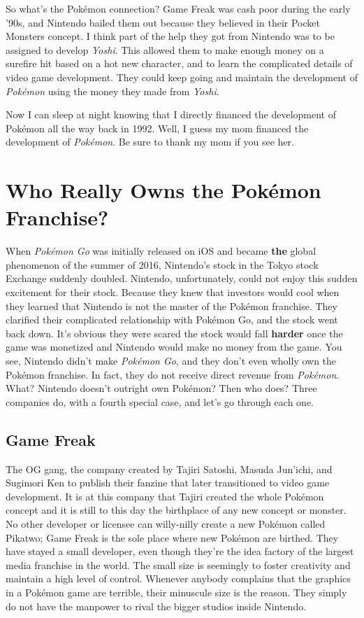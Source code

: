 \documentclass{book}
\begin{document}
So what’s the Pokémon connection? Game Freak was cash poor during the early ’90s, and Nintendo bailed them out because they believed in their Pocket Monsters concept. I think part of the help they got from Nintendo was to be assigned to develop \emph{Yoshi}. This allowed them to make enough money on a surefire hit based on a hot new character,
 and to learn the complicated details of video game development. They could keep going and maintain the development of \emph{Pokémon} using the money they made from \emph{Yoshi}.

Now I can sleep at night knowing that I directly financed the development of Pokémon all the way back in 1992. Well, I guess my mom financed the development of \emph{Pokémon}. Be sure to thank my mom if you see her.

\FloatBarrier\needspace{5pt}\section*{Who Really Owns the Pokémon Franchise?}\nopagebreak[4]

When \emph{Pokémon Go} was initially released on iOS and became \textbf{the} global phenomenon of the summer of 2016, Nintendo’s stock in the Tokyo stock Exchange suddenly doubled. Nintendo, unfortunately, could not enjoy this sudden excitement for their stock. Because they knew that investors would cool when they learned that Nintendo is not the master of the Pokémon franchise. They clarified their complicated relationship with Pokémon Go, and the stock went back down. It’s obvious they were scared the stock would fall \textbf{harder} once the game was monetized and Nintendo would make no money from the game. You see, Nintendo didn’t make \emph{Pokémon Go}, and they don’t even wholly own the Pokémon franchise. In fact, they do not receive direct revenue from \emph{Pokémon}. What? Nintendo doesn’t outright own Pokémon? Then who does? Three companies do, with a fourth special case, and let’s go through each one.

\subsection*{Game Freak}\nopagebreak[4]

The OG gang, the company created by Tajiri Satoshi, Masuda Jun’ichi, and Sugimori Ken to publish their fanzine that later transitioned to video game development. It is at this company that Tajiri created the whole Pokémon concept and it is still to this day the birthplace of any new concept or monster. No other developer or licensee can willy-nilly create a new Pokémon called Pikatwo; Game Freak is the sole place where new Pokémon are birthed. They have stayed a small developer, even though they’re the idea factory of the largest media franchise in the world. The small size is seemingly to foster creativity and maintain a high level of control. Whenever anybody complains that the graphics in a Pokémon game are terrible, their minuscule size is the reason. They simply do not have the manpower to rival the bigger studios inside Nintendo.
\end{document}
